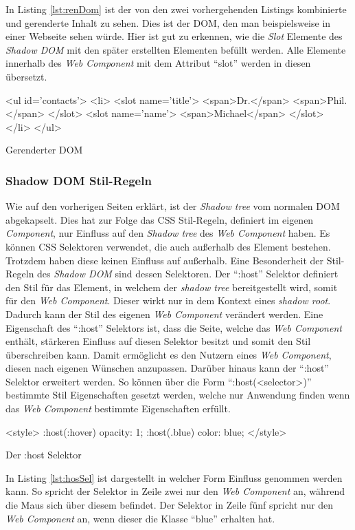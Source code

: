 \documentclass[12pt, paper=a4, bibtotoc, toc=listof, headsepline=true]{scrreprt}
\begin{document}
			In Listing \ref{lst:renDom} ist der von den zwei vorhergehenden Listings kombinierte und gerenderte Inhalt zu sehen. Dies ist der \ac{DOM}, den man beispielsweise in einer Webseite sehen würde. Hier ist gut zu erkennen, wie die \emph{Slot} Elemente des \emph{Shadow \ac{DOM}} mit den später erstellten Elementen befüllt werden. Alle Elemente innerhalb des \emph{Web Component} mit dem Attribut \enquote{slot} werden in diesen übersetzt.
			\begin{listing}
				\begin{HTMLcode*}{}
<ul id='contacts'>
   <li>
      <slot name='title'>
	     <span>Dr.</span>
	     <span>Phil.</span>
	  </slot>
      <slot name='name'>
	     <span>Michael</span>
      </slot>
   </li>
</ul>
				\end{HTMLcode*}
				\caption{Gerenderter DOM}
				\label{lst:renDom}
			\end{listing}
		\subsubsection{Shadow DOM Stil-Regeln}
		Wie auf den vorherigen Seiten erklärt, ist der \emph{Shadow tree} vom normalen \ac{DOM} abgekapselt. Dies hat zur Folge das \ac{CSS} Stil-Regeln, definiert im eigenen \emph{Component}, nur Einfluss auf den \emph{Shadow tree} des \emph{Web Component} haben. Es können \ac{CSS} Selektoren verwendet, die auch außerhalb des Element bestehen. Trotzdem haben diese keinen Einfluss auf außerhalb. \newline
		Eine Besonderheit der Stil-Regeln des \emph{Shadow DOM} sind dessen Selektoren. Der \enquote{:host} Selektor definiert den Stil für das Element, in welchem der \emph{shadow tree} bereitgestellt wird, somit für den \emph{Web Component}. Dieser wirkt nur in dem Kontext eines \emph{shadow root}. Dadurch kann der Stil des eigenen \emph{Web Component} verändert werden. Eine Eigenschaft des \enquote{:host} Selektors ist, dass die Seite, welche das \emph{Web Component} enthält, stärkeren Einfluss auf diesen Selektor besitzt und somit den Stil überschreiben kann. Damit ermöglicht es den Nutzern eines \emph{Web Component}, diesen nach eigenen Wünschen anzupassen. Darüber hinaus kann der \enquote{:host} Selektor erweitert werden. So können über die Form \enquote{:host(<selector>)} bestimmte Stil Eigenschaften gesetzt werden, welche nur Anwendung finden wenn das \emph{Web Component} bestimmte Eigenschaften erfüllt. 
		\begin{listing}
		\begin{HTMLcode*}{}
<style>		
:host(:hover) {
   opacity: 1;
}
:host(.blue) {
   color: blue;
}
</style>
		\end{HTMLcode*}
		\caption{Der :host Selektor}
		\label{lst:hosSel}
		\end{listing}
		In Listing \ref{lst:hosSel} ist dargestellt in welcher Form Einfluss genommen werden kann. So spricht der Selektor in Zeile zwei nur den \emph{Web Component} an, während die Maus sich über diesem befindet. Der Selektor in Zeile fünf spricht nur den \emph{Web Component} an, wenn dieser die Klasse \enquote{blue} erhalten hat.
\end{document}

